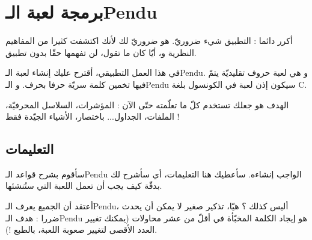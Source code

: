 \chapter{برمجة لعبة
الـ\textenglish{Pendu}}
أكرر دائما : التطبيق شيء ضروريّ. هو ضروريّ لك لأنك اكتشفت كثيرا من المفاهيم النظرية و، أيّا كان ما تقول، لن تفهمها حقّا بدون تطبيق.

في هذا العمل التطبيقي، أقترح عليك إنشاء لعبة الـ\textenglish{Pendu}.
و هي لعبة حروف تقليديّة يتمّ فيها تخمين كلمة سريّة حرفا بحرف. و الـ\textenglish{Pendu}
سيكون إذن لعبة في الكونسول بلغة
\textenglish{C}.

الهدف هو جعلك تستخدم كلّ ما تعلّمته حتّى الآن : المؤشرات، السلاسل المحرفيّة، الملفات، الجداول... باختصار، الأشياء الجيّدة فقط !

\section{التعليمات}
سأقوم بشرح قواعد الـ\textenglish{Pendu}
الواجب إنشاءه. سأعطيك هنا التعليمات، أي سأشرح لك بدقّة كيف يجب أن تعمل اللعبة التي ستُنشئها.

أعتقد أن الجميع يعرف
الـ\textenglish{Pendu}،
أليس كذلك ؟ هيّا، تذكير صغير لا يمكن أن يحدث ضررا : هدف الـ\textenglish{Pendu}
هو إيجاد الكلمة المخبّأة في أقلّ من عشر محاولات (يمكنك تغيير العدد الأقصى لتغيير صعوبة اللعبة، بالطبع !).
